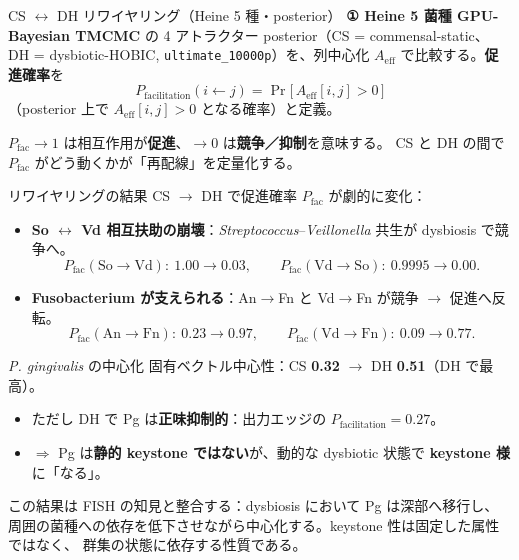 \documentclass[
  ignorenonframetext,
  aspectratio=169,
]{beamer}
\providecommand{\tightlist}{%
  \setlength{\itemsep}{0pt}\setlength{\parskip}{0pt}}
\begin{document}
\begin{frame}[fragile]{CS \(\leftrightarrow\) DH リワイヤリング（Heine 5
種・posterior）}
\protect\hypertarget{cs-leftrightarrow-dh-ux30eaux30efux30a4ux30e4ux30eaux30f3ux30b0heine-5-ux7a2eposterior}{}
\textbf{① Heine 5 菌種 GPU-Bayesian TMCMC} の 4 アトラクター
posterior（CS = commensal-static、 DH = dysbiotic-HOBIC,
\texttt{ultimate\_10000p}）を、列中心化 \(A_{\text{eff}}\)
で比較する。\textbf{促進確率}を
\[P_{\text{facilitation}}(i\!\leftarrow\! j) = \Pr\big[\,A_{\text{eff}}[i,j] > 0\,\big]\]
（posterior 上で \(A_{\text{eff}}[i,j]>0\) となる確率）と定義。

\(P_{\text{fac}}\to 1\) は相互作用が\textbf{促進}、\(\to 0\)
は\textbf{競争／抑制}を意味する。 CS と DH の間で \(P_{\text{fac}}\)
がどう動くかが「再配線」を定量化する。
\end{frame}

\begin{frame}{リワイヤリングの結果}
\protect\hypertarget{ux30eaux30efux30a4ux30e4ux30eaux30f3ux30b0ux306eux7d50ux679c}{}
CS \(\to\) DH で促進確率 \(P_{\text{fac}}\) が劇的に変化：

\begin{itemize}
\tightlist
\item
  \textbf{So \(\leftrightarrow\) Vd
  相互扶助の崩壊}：\emph{Streptococcus}--\emph{Veillonella} 共生が
  dysbiosis で競争へ。
  \[P_{\text{fac}}(\text{So}\!\to\!\text{Vd}):\ 1.00 \to 0.03,\qquad
    P_{\text{fac}}(\text{Vd}\!\to\!\text{So}):\ 0.9995 \to 0.00.\]
\item
  \textbf{Fusobacterium が支えられる}：An\(\to\)Fn と Vd\(\to\)Fn が競争
  \(\to\) 促進へ反転。
  \[P_{\text{fac}}(\text{An}\!\to\!\text{Fn}):\ 0.23 \to 0.97,\qquad
    P_{\text{fac}}(\text{Vd}\!\to\!\text{Fn}):\ 0.09 \to 0.77.\]
\end{itemize}
\end{frame}

\begin{frame}{\emph{P. gingivalis} の中心化}
\protect\hypertarget{p.-gingivalis-ux306eux4e2dux5fc3ux5316}{}
固有ベクトル中心性：CS \textbf{0.32} \(\to\) DH \textbf{0.51}（DH
で最高）。

\begin{itemize}
\tightlist
\item
  ただし DH で Pg は\textbf{正味抑制的}：出力エッジの
  \(P_{\text{facilitation}} = 0.27\)。
\item
  \(\Rightarrow\) Pg は\textbf{静的 keystone ではない}が、動的な
  dysbiotic 状態で \textbf{keystone 様}に「なる」。
\end{itemize}

\vspace{0.3em}

この結果は FISH の知見と整合する：dysbiosis において Pg は深部へ移行し、
周囲の菌種への依存を低下させながら中心化する。keystone
性は固定した属性ではなく、 群集の状態に依存する性質である。
\end{frame}
\end{document}
